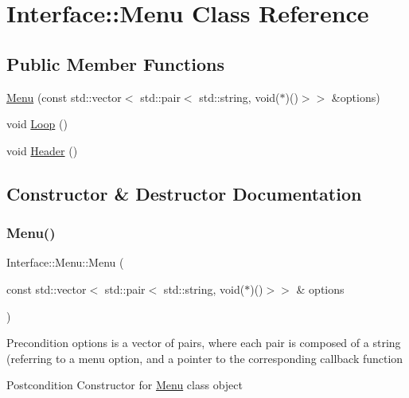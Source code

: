 \hypertarget{classInterface_1_1Menu}{}\section{Interface\+:\+:Menu Class Reference}
\label{classInterface_1_1Menu}
\subsection*{Public Member Functions}
\begin{DoxyCompactItemize}
\item 
\hyperlink{classInterface_1_1Menu_ad9d0ce403f0ad96df24bcde018030650}{Menu} (const std\+::vector$<$ std\+::pair$<$ std\+::string, void($\ast$)()$>$$>$ \&options)
\item 
void \hyperlink{classInterface_1_1Menu_ac6e7791ff9ffb233d07e05653a4f5bb2}{Loop} ()
\item 
void \hyperlink{classInterface_1_1Menu_ac9c262f57118f3b3043bed327f195c00}{Header} ()
\end{DoxyCompactItemize}


\subsection{Constructor \& Destructor Documentation}
\mbox{\label{classInterface_1_1Menu_ad9d0ce403f0ad96df24bcde018030650}} 
\subsubsection{\texorpdfstring{Menu()}{Menu()}}
{\footnotesize\ttfamily Interface\+::\+Menu\+::\+Menu (\begin{DoxyParamCaption}\item[{const std\+::vector$<$ std\+::pair$<$ std\+::string, void($\ast$)()$>$$>$ \&}]{options }\end{DoxyParamCaption})}

\begin{DoxyPrecond}{Precondition}
options is a vector of pairs, where each pair is composed of a string (referring to a menu option, and a pointer to the corresponding callback function 
\end{DoxyPrecond}
\begin{DoxyPostcond}{Postcondition}
Constructor for \hyperlink{classInterface_1_1Menu}{Menu} class object 
\end{DoxyPostcond}


